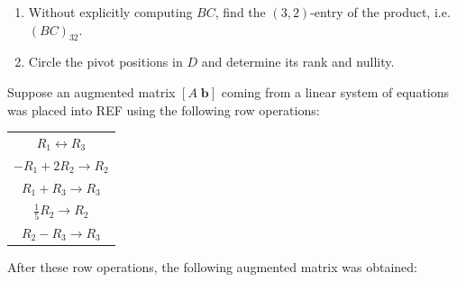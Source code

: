\documentclass[12pt,letterpaper]{exam}
\begin{document}
\begin{questions}
\begin{enumerate}
\item[(e)] Without explicitly computing $BC$, find the $(3,2)$-entry of the product, i.e. $(BC)_{32}$. \par\vspace{0.3cm}
\wsol{%
	\[
	\begin{aligned}
	(BC)_{32}&= \text{row 3 of } B \cdot \text{column 2 of } C \\[0.2cm]
	&= \langle 1, -2, 1, 0 \rangle \cdot \langle 5, 3, 6, 1 \rangle \\[0.2cm]
	&= 1(5) - 2(3) + 1(6) + 0(1) \\[0.2cm]
	&= 5 - 6 + 6 + 0 \\[0.2cm]
	&= \boxed{5}
	\end{aligned}
	\]%
} \par\vspace{4cm}

\item[(f)] Circle the pivot positions in $D$ and determine its rank and nullity. \par\vspace{0.3cm}
\end{enumerate}



\newpage
\question[15] Suppose an augmented matrix $[A \;\mathbf{b}]$ coming from a linear system of equations was placed into REF using the following row operations: \par
	\begin{table}[!ht]
	\centering
	\begin{tabular}{c}
	$R_1 \longleftrightarrow R_3$ \\[0.1cm]
	$-R_1 + 2R_2 \to R_2$ \\[0.1cm]
	$R_1 + R_3 \to R_3$ \\[0.1cm]
	$\frac{1}{5} R_2 \to R_2$ \\[0.1cm]
	$R_2 - R_3 \to R_3$
	\end{tabular}
	\end{table} \par
After these row operations, the following augmented matrix was obtained:


\end{questions}
\end{document}
